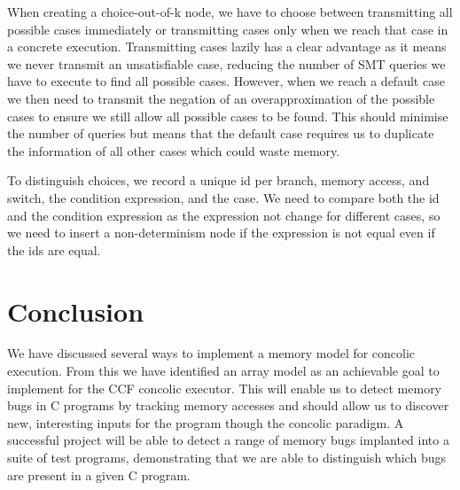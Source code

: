\documentclass[12pt,twoside]{report}
\begin{document}
When creating a choice-out-of-k node, we have to choose between transmitting all possible cases immediately or transmitting cases only when we reach that case in a concrete execution. Transmitting cases lazily has a clear advantage as it means we never transmit an unsatisfiable case, reducing the number of SMT queries we have to execute to find all possible cases. However, when we reach a default case we then need to transmit the negation of an overapproximation of the possible cases to ensure we still allow all possible cases to be found. This should minimise the number of queries but means that the default case requires us to duplicate the information of all other cases which could waste memory.

To distinguish choices, we record a unique id per branch, memory access, and switch, the condition expression, and the case. We need to compare both the id and the condition expression as the expression not change for different cases, so we need to insert a non-determinism node if the expression is not equal even if the ids are equal.




\chapter{Conclusion}
We have discussed several ways to implement a memory model for concolic execution. From this we have identified an array model as an achievable goal to implement for the CCF concolic executor. This will enable us to detect memory bugs in C programs by tracking memory accesses and should allow us to discover new, interesting inputs for the program though the concolic paradigm. A successful project will be able to detect a range of memory bugs implanted into a suite of test programs, demonstrating that we are able to distinguish which bugs are present in a given C program.




\end{document}
